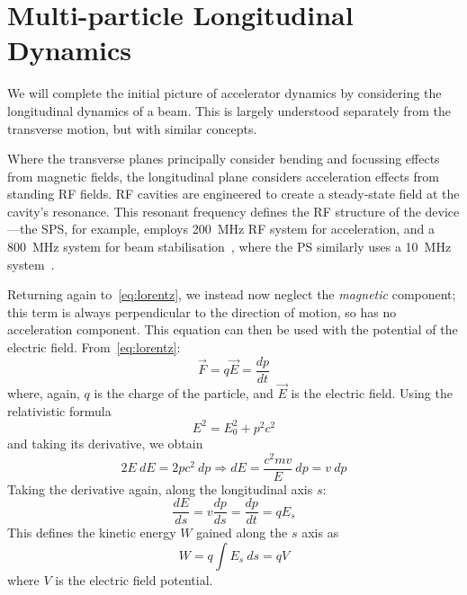 \documentclass[11pt]{report}
\begin{document}


\section{Multi-particle Longitudinal Dynamics}

We will complete the initial picture of accelerator dynamics by considering the longitudinal dynamics of a beam. This is largely understood separately from the transverse motion, but with similar concepts.

Where the transverse planes principally consider bending and focussing effects from magnetic fields, the longitudinal plane considers acceleration effects from standing RF fields. RF cavities are engineered to create a steady-state field at the cavity's resonance. This resonant frequency defines the RF structure of the device---the SPS, for example, employs \qty{200}{\mega\hertz} RF system for acceleration, and a \qty{800}{\mega\hertz} system for beam stabilisation~\cite{spsrf}, where the PS similarly uses a \qty{10}{\mega\hertz} system~\cite{psrf}.

Returning again to~\autoref{eq:lorentz}, we instead now neglect the \textit{magnetic} component; this term is always perpendicular to the direction of motion, so has no acceleration component. This equation can then be used with the potential of the electric field. From~\autoref{eq:lorentz}:
\begin{equation}
  \vec F = q\vec E = \frac{dp}{dt}
\end{equation} where, again, $q$ is the charge of the particle, and $\vec E$ is the electric field. Using the relativistic formula
\begin{equation}
  E^2=E_0^2 + p^2c^2
  \label{eq:rel_long}
\end{equation} and taking its derivative, we obtain 
\begin{equation}
  2E\ dE = 2pc^2\ dp \Rightarrow dE = \frac{c^2mv}{E}\ dp = v\ dp
\end{equation}
Taking the derivative again, along the longitudinal axis $s$:
\begin{equation}
  \frac{dE}{ds} = v\frac{dp}{ds} = \frac{dp}{dt} = qE_s
\end{equation}
This defines the kinetic energy $W$ gained along the $s$ axis as 
\begin{equation}
  W=q\int E_s \ ds =qV
\end{equation} where $V$ is the electric field potential.
\end{document}
